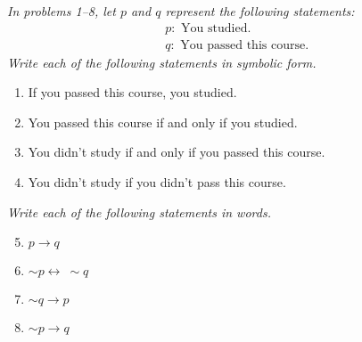 \emph{In problems 1--8, let $p$ and $q$ represent the following statements:}
\begin{align*}
&p: \textrm{ You studied.}\\
&q: \textrm{ You passed this course.}
\end{align*}
\emph{Write each of the following statements in symbolic form.}

\begin{enumerate}
\item If you passed this course, you studied. 

\item You passed this course if and only if you studied. 

\item You didn't study if and only if you passed this course. 

\item You didn't study if you didn't pass this course. 
\end{enumerate}

\emph{Write each of the following statements in words.}
\begin{enumerate}
\setcounter{enumi}{4}

\item $p \to q$ 

\item $\sim p \leftrightarrow\ \sim q$ 

\item $\sim q \to p$ 

\item $\sim p \to q$ 
\end{enumerate}
\pagebreak

